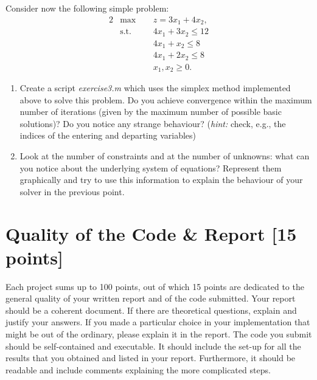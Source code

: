 \documentclass[unicode,11pt,a4paper,oneside,numbers=endperiod,openany]{scrartcl}
\begin{document}
Consider now the following simple problem:
\begin{alignat*}{2}
	&\text{max}\;\, && z = 3x_1+4x_2,\\
	&\text{s.t.} && 4x_1+3x_2\leq 12\\
	& && 4x_1+x_2\leq 8\\
	& && 4x_1+2x_2\leq 8\\
	& && x_1, x_2 \geq 0.
\end{alignat*}

\begin{enumerate}
	\item Create a script \emph{exercise3.m} which uses the simplex method implemented above to solve this problem. Do you achieve convergence within the maximum number of iterations (given by the maximum number of possible basic solutions)? Do you notice any strange behaviour? (\emph{hint:} check, e.g., the indices of the entering and departing variables)
	\item Look at the number of constraints and at the number of unknowns: what can you notice about the underlying system of equations? Represent them graphically and try to use this information to explain the behaviour of your solver in the previous point. 
\end{enumerate}

\section{Quality of the Code \& Report [15 points]}

Each project sums up to 100 points, out of which 15 points are dedicated to the general quality of your written report and of the code submitted. Your report should be a coherent document. If there are theoretical questions, explain and justify your answers. If you made a particular choice in your implementation that might be out of the ordinary, please explain it in the report. The code you submit should be self-contained and executable. It should include the set-up for all the results that you obtained and listed in your report. Furthermore, it should be readable and include comments explaining the more complicated steps.
\end{document}
